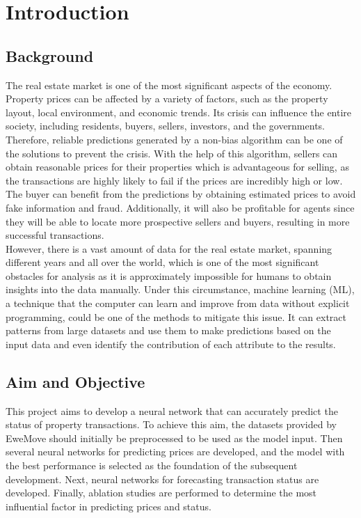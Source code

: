 \documentclass[12pt,twoside]{report}
\begin{document}
\chapter{Introduction}
\section{Background}
The real estate market is one of the most significant aspects of the economy. Property prices can be affected by a variety of factors, such as the property layout, local environment, and economic trends. Its crisis can influence the entire society, including residents, buyers, sellers, investors, and the governments. Therefore, reliable predictions generated by a non-bias algorithm can be one of the solutions to prevent the crisis. With the help of this algorithm, sellers can obtain reasonable prices for their properties which is advantageous for selling, as the transactions are highly likely to fail if the prices are incredibly high or low. The buyer can benefit from the predictions by obtaining estimated prices to avoid fake information and fraud. Additionally, it will also be profitable for agents since they will be able to locate more prospective sellers and buyers, resulting in more successful transactions. 
\\

However, there is a vast amount of data for the real estate market, spanning different years and all over the world, which is one of the most significant obstacles for analysis as it is approximately impossible for humans to obtain insights into the data manually. Under this circumstance, machine learning (ML), a technique that the computer can learn and improve from data without explicit programming, could be one of the methods to mitigate this issue. It can extract patterns from large datasets and use them to make predictions based on the input data and even identify the contribution of each attribute to the results.
\\

\section{Aim and Objective}
This project aims to develop a neural network that can accurately predict the status of property transactions. To achieve this aim, the datasets provided by EweMove should initially be preprocessed to be used as the model input. Then several neural networks for predicting prices are developed, and the model with the best performance is selected as the foundation of the subsequent development. Next, neural networks for forecasting transaction status are developed. Finally, ablation studies are performed to determine the most influential factor in predicting prices and status. 
\\
\end{document}
